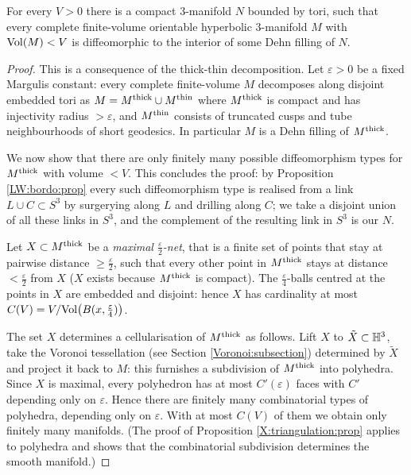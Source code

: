 \begin{teo} \label{V:teo}
For every $V>0$ there is a compact 3-manifold $N$ bounded by tori, such that every complete finite-volume orientable hyperbolic 3-manifold $M$ with ${\rm Vol}(M)<V$ is diffeomorphic to the interior of some Dehn filling of $N$.
\end{teo}
\begin{proof}
This is a consequence of the thick-thin decomposition. Let $\varepsilon>0$ be a fixed Margulis constant: every complete finite-volume $M$ decomposes along disjoint embedded tori as $M=M^{\rm thick} \cup M^{\rm thin}$ where $M^{\rm thick}$ is compact and has injectivity radius $>\varepsilon$, and $M^{\rm thin}$ consists of truncated cusps and tube neighbourhoods of short geodesics. In particular $M$ is a Dehn filling of $M^{\rm thick}$.

We now show that there are only finitely many possible diffeomorphism types for $M^{\rm thick}$ with volume $<V$. This concludes the proof: by Proposition \ref{LW:bordo:prop}
every such diffeomorphism type is realised from a link $L\cup C\subset S^3$ by surgerying along $L$ and drilling along $C$; we take a disjoint union of all these links in $S^3$, and the complement of the resulting link in $S^3$ is our $N$.

Let $X\subset M^{\rm thick}$ be a \emph{maximal $\frac{\varepsilon}2$-net}, that is a finite set of points that stay at pairwise distance $\geqslant \frac{\varepsilon}2$, such that every other point in $M^{\rm thick}$ stays at distance $< \frac {\varepsilon}2$ from $X$ ($X$ exists because $M^{\rm thick}$ is compact). The $\frac{\varepsilon}4$-balls centred at the points in $X$ are embedded and disjoint: hence $X$ has cardinality at most $C(V) = V/{\rm Vol}\big(B(x, \frac{\varepsilon}4)\big)$.

The set $X$ determines a cellularisation of $M^{\rm thick}$ as follows. Lift $X$ to $\tilde X\subset \mathbb{H}^3$, take the Voronoi tessellation (see Section \ref{Voronoi:subsection}) determined by $\tilde X$ and project it back to $M$: this furnishes a subdivision of $M^{\rm thick}$ into polyhedra. Since $X$ is maximal, every polyhedron has at most $C'(\varepsilon)$ faces with $C'$ depending only on $\varepsilon$. Hence there are finitely many combinatorial types of polyhedra, depending only on $\varepsilon$. With at most $C(V)$ of them we obtain only finitely many manifolds. (The proof of Proposition \ref{X:triangulation:prop} applies to polyhedra and shows that the combinatorial subdivision determines the smooth manifold.)
\end{proof}

